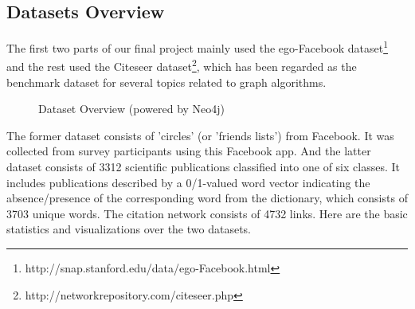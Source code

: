 \documentclass[11pt]{article}
\begin{document}
\subsection{Datasets Overview}
The first two parts of our final project mainly used the ego-Facebook dataset\footnote{http://snap.stanford.edu/data/ego-Facebook.html} and the rest used the Citeseer dataset\footnote{http://networkrepository.com/citeseer.php}, which has been regarded as the benchmark dataset for several topics related to graph algorithms.
\begin{figure}[H]
	\centering
	\centering
	\caption{Dataset Overview (powered by Neo4j)}
\end{figure}
The former dataset consists of 'circles' (or 'friends lists') from Facebook. It was collected from survey participants using this Facebook app. And the latter dataset consists of 3312 scientific publications classified into one of six classes. It includes publications described by a 0/1-valued word vector indicating the absence/presence of the corresponding word from the dictionary, which consists of 3703 unique words. The citation network consists of 4732 links. Here are the basic statistics and visualizations over the two datasets.
\end{document}
